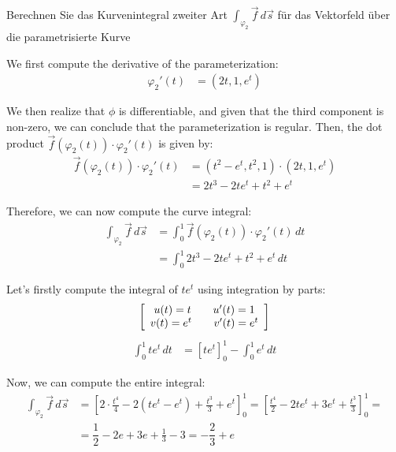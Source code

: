 \begin{ejercicio}
Berechnen Sie das Kurvenintegral zweiter Art $\displaystyle \int_{\varphi_2} \vec{f} \, d\vec{s}$ für das Vektorfeld
über die parametrisierte Kurve

    We first compute the derivative of the parameterization:
    \begin{align*}
        \varphi_2'(t) &= (2t, 1, e^t)
    \end{align*}

    We then realize that $\phi$ is differentiable, and given that the third component is non-zero, we can conclude that the parameterization is regular. Then, the dot product $\vec{f}(\varphi_2(t)) \cdot \varphi_2'(t)$ is given by:
    \begin{align*}
        \vec{f}(\varphi_2(t)) \cdot \varphi_2'(t) &= (t^2 - e^t, t^2, 1) \cdot (2t, 1, e^t) \\
        &= 2t^3 - 2t e^t + t^2 + e^t
    \end{align*}

    Therefore, we can now compute the curve integral:
    \begin{align*}
        \int_{\varphi_2} \vec{f} \, d\vec{s} &= \int_0^1 \vec{f}(\varphi_2(t)) \cdot \varphi_2'(t) \, dt \\
        &= \int_0^1 2t^3 - 2t e^t + t^2 + e^t \, dt
    \end{align*}

    Let's firstly compute the integral of $t e^t$ using integration by parts:
    \begin{equation*}
        \left[\begin{array}{c} u(t)=t\qquad u'(t)=1 \\ v(t)=e^t\qquad v'(t)=e^t \end{array}\right]
    \end{equation*}
    \begin{align*}
        \int_0^1 t e^t \, dt &= \left[ t e^t \right]_0^1 - \int_0^1 e^t \, dt
    \end{align*}

    Now, we can compute the entire integral:
    \begin{align*}
        \int_{\varphi_2} \vec{f} \, d\vec{s} &= \left[2 \cdot \frac{t^4}{4} - 2 \left( t e^t - e^t \right) + \frac{t^3}{3} + e^t \right]_0^1
        = \left[\frac{t^4}{2} - 2te^t +3e^t + \frac{t^3}{3}\right]_0^1
        =\\&= \dfrac{1}{2} - 2e + 3e + \frac{1}{3} - 3
        = -\dfrac{2}{3} + e
    \end{align*}
\end{ejercicio}

